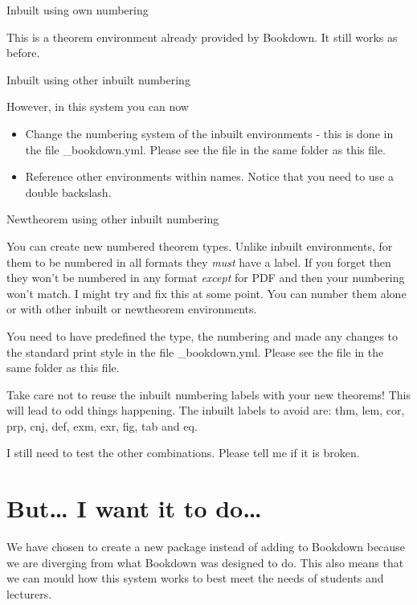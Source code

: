 \documentclass[
  10pt,
  a4paper]{article}
\providecommand{\tightlist}{%
  \setlength{\itemsep}{0pt}\setlength{\parskip}{0pt}}
\theoremstyle{plain}
\theoremstyle{definition}
\theoremstyle{plain}
\theoremstyle{plain}
\theoremstyle{plain}
\theoremstyle{plain}
\theoremstyle{definition}
\theoremstyle{definition}
\theoremstyle{remark}
\theoremstyle{remark}
\let\BeginKnitrBlock\begin \let\EndKnitrBlock\end
\begin{document}
Inbuilt using own numbering
\begingroup\renewcommand{\thetheorem}{\ref{thm:thm1}}
\BeginKnitrBlock{theorem}[Foo]
{ }
This is a theorem environment already provided by Bookdown. It still works as before.
\EndKnitrBlock{theorem}
\endgroup\addtocounter{theorem}{-1}
Inbuilt using other inbuilt numbering
\begingroup\renewcommand{\thetheorem}{\ref{prp:prp1}}
\BeginKnitrBlock{proposition}[Thingy we need for \ref{thm:thm1}]
{ }
However, in this system you can now

\begin{itemize}
\tightlist
\item
  Change the numbering system of the inbuilt environments - this is done in the file \_bookdown.yml. Please see the file in the same folder as this file.
\item
  Reference other environments within names. Notice that you need to use a double backslash.
\end{itemize}
\EndKnitrBlock{proposition}
\endgroup\addtocounter{theorem}{-1}
Newtheorem using other inbuilt numbering
\begingroup\renewcommand{\thedefinition}{\ref{Def:def1}}
\BeginKnitrBlock{Definitions}
{}
You can create new numbered theorem types. Unlike inbuilt environments, for them to be numbered in all formats they \emph{must} have a label. If you forget then they won't be numbered in any format \emph{except} for PDF and then your numbering won't match. I might try and fix this at some point. You can number them alone or with other inbuilt or newtheorem environments.

You need to have predefined the type, the numbering and made any changes to the standard print style in the file \_bookdown.yml. Please see the file in the same folder as this file.

Take care not to reuse the inbuilt numbering labels with your new theorems! This will lead to odd things happening. The inbuilt labels to avoid are: thm, lem, cor, prp, cnj, def, exm, exr, fig, tab and eq.
\EndKnitrBlock{Definitions}
\endgroup\addtocounter{definition}{-1}
I still need to test the other combinations. Please tell me if it is broken.

\hypertarget{but-i-want-it-to-do}{%
\section{But\ldots{} I want it to do\ldots{}}\label{but-i-want-it-to-do}}

We have chosen to create a new package instead of adding to Bookdown because we are diverging from what Bookdown was designed to do. This also means that we can mould how this system works to best meet the needs of students and lecturers.
\end{document}
